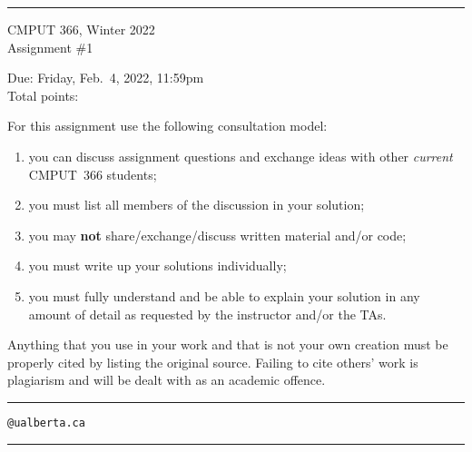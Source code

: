 \documentclass{article}
\newcounter{totalpoints}
\begin{document}
{\bigskip\hrule\bigskip
\huge
\noindent CMPUT 366, Winter 2022\\
Assignment \#1

\large
Due: Friday, Feb.\ 4, 2022, 11:59pm\\
Total points: 

For this assignment use the following consultation model:
\begin{enumerate}

\item you can discuss assignment questions and exchange ideas with other \emph{current} CMPUT~366 students;

\item you must list all members of the discussion in your solution;

\item you may {\bf not} share/exchange/discuss written material and/or code;

\item you must write up your solutions individually;

\item you must fully understand and be able to explain your solution in any amount of detail as requested by the instructor and/or the TAs.

\end{enumerate}

Anything that you use in your work and that is not your own creation must be properly cited by listing the original source. Failing to cite others' work is plagiarism and will be dealt with as an academic offence.


\bigskip\bigskip\hrule\bigskip

\vspace{1cm}
\hspace{1cm}{\bf First name:} \underline{\hspace{7cm}}

\vspace{1cm}
\hspace{1cm}{\bf Last name:} \underline{\hspace{7cm}}

\vspace{1cm}
\hspace{1cm}{\bf CCID:} \underline{\hspace{5.5cm}}\verb|@ualberta.ca|

\vspace{1cm}
\hspace{1cm}{\bf Collaborators:} \underline{\hspace{6.5cm}}

\vspace{1cm}
\bigskip\hrule\bigskip
}
\end{document}
